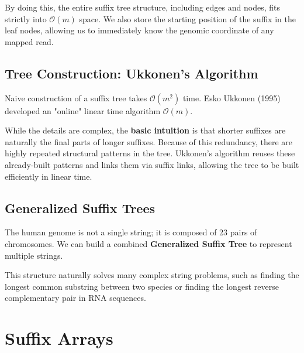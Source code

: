 By doing this, the entire suffix tree structure, including edges and nodes, fits strictly into $\mathcal{O}(m)$ space. We also store the starting position of the suffix in the leaf nodes, allowing us to immediately know the genomic coordinate of any mapped read.

\subsection{Tree Construction: Ukkonen's Algorithm}

Naive construction of a suffix tree takes $\mathcal{O}(m^2)$ time. Esko Ukkonen (1995) developed an "online" linear time algorithm $\mathcal{O}(m)$. 

While the details are complex, the \textbf{basic intuition} is that shorter suffixes are naturally the final parts of longer suffixes. Because of this redundancy, there are highly repeated structural patterns in the tree. Ukkonen's algorithm reuses these already-built patterns and links them via suffix links, allowing the tree to be built efficiently in linear time.

\subsection{Generalized Suffix Trees}

The human genome is not a single string; it is composed of 23 pairs of chromosomes. We can build a combined \textbf{Generalized Suffix Tree} to represent multiple strings.


This structure naturally solves many complex string problems, such as finding the longest common substring between two species or finding the longest reverse complementary pair in RNA sequences.

\section{Suffix Arrays}

